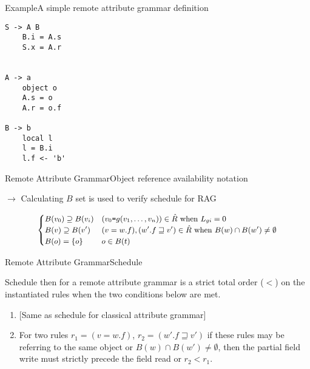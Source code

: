 \begin{frame}[fragile=singleslide]{Example}{A simple remote attribute grammar definition}

\begin{multicols}{3}
\begin{Verbatim}[fontsize=\small]
S -> A B
    B.i = A.s
    S.x = A.r


A -> a
    object o
    A.s = o
    A.r = o.f

B -> b
    local l
    l = B.i
    l.f <- 'b'

\end{Verbatim}
\end{multicols}
    
\end{frame}





\begin{frame}{Remote Attribute Grammar}{Object reference availability notation}

$\to$ Calculating $B$ set is used to \alert{verify schedule for RAG} \cite{Boyland05remoteattribute}

\newlinevspace

\begin{equation}
\small
  \begin{gathered}
\begin{cases}
B(v_0) \supseteq B(v_i)    & (v_0 \texttt{=} g(v_1, \dots, v_n )) \in \hat R \text{ when } L_{g i} = 0 \\
B(v) \supseteq B(v') &  (v = w. f ), (w'.f \sqsupseteq v') \in \hat R \text{ when } B(w) \cap B(w') \neq \emptyset \\
B(o) = \{o\} & o \in B(t) \\
\end{cases}
  \end{gathered}
\end{equation}

\end{frame}

\begin{frame}{Remote Attribute Grammar}{Schedule}

\begin{definition}
Schedule then for a remote attribute grammar is a strict total order ($<$) on the instantiated rules when the two conditions below are met.
 
\begin{minipage}[t]{\linegoal}
\begin{enumerate}

\item {[Same as schedule for classical attribute grammar]}

\item For two rules $r_1 = (v = w.f)$, $r_2 = (w'.f \sqsupseteq v')$ if these rules may be referring to the same object or $B(w) \cap B(w') \neq \emptyset$, then the partial field write must strictly precede the field read or $r_2 < r_1$.
\end{enumerate}
\end{minipage}
\end{definition}
    
\end{frame}


